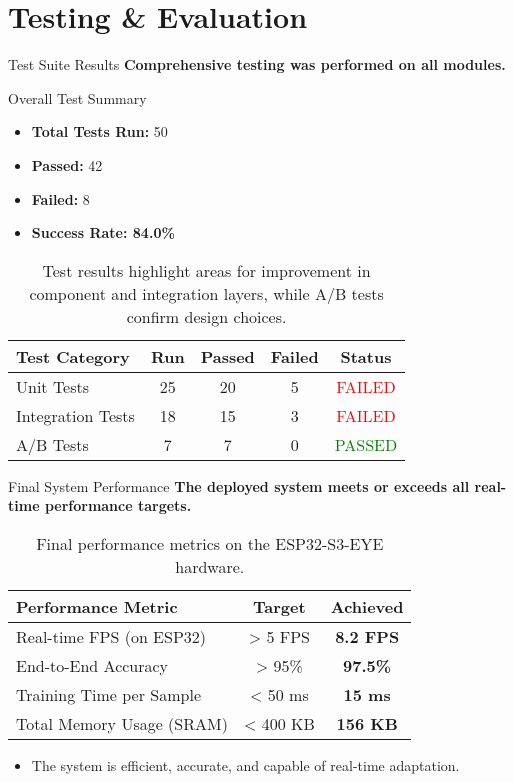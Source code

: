 \documentclass{beamer}
\begin{document}
\section{Testing \& Evaluation}
\begin{frame}{Test Suite Results}
    \textbf{Comprehensive testing was performed on all modules.}
    \begin{block}{Overall Test Summary}
        \begin{itemize}
            \item \textbf{Total Tests Run:} 50
            \item \textbf{Passed:} 42
            \item \textbf{Failed:} 8
            \item \textbf{Success Rate: 84.0\%}
        \end{itemize}
    \end{block}
    \begin{table}[]
        \centering
        \begin{tabular}{@{}lcccc@{}}
            \toprule
            \textbf{Test Category} & \textbf{Run} & \textbf{Passed} & \textbf{Failed} & \textbf{Status} \\ \midrule
            Unit Tests & 25 & 20 & 5 & \textcolor{red}{FAILED} \\
            Integration Tests & 18 & 15 & 3 & \textcolor{red}{FAILED} \\
            A/B Tests & 7 & 7 & 0 & \textcolor{green}{PASSED} \\ \bottomrule
        \end{tabular}
        \caption{Test results highlight areas for improvement in component and integration layers, while A/B tests confirm design choices.}
    \end{table}
\end{frame}

\begin{frame}{Final System Performance}
    \textbf{The deployed system meets or exceeds all real-time performance targets.}
    \begin{table}[]
        \centering
        \begin{tabular}{@{}lcc@{}}
            \toprule
            \textbf{Performance Metric} & \textbf{Target} & \textbf{Achieved} \\ \midrule
            Real-time FPS (on ESP32) & > 5 FPS & \textbf{8.2 FPS} \\
            End-to-End Accuracy & > 95\% & \textbf{97.5\%} \\
            Training Time per Sample & < 50 ms & \textbf{15 ms} \\
            Total Memory Usage (SRAM) & < 400 KB & \textbf{156 KB} \\
            \bottomrule
        \end{tabular}
        \caption{Final performance metrics on the ESP32-S3-EYE hardware.}
    \end{table}
    \begin{itemize}
        \item The system is efficient, accurate, and capable of real-time adaptation.
    \end{itemize}
\end{frame}
\end{document}
